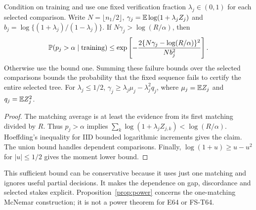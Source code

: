 \begin{proposition}\label{prop:selected-power}
Condition on training and use one fixed verification fraction $\lambda_j\in(0,1)$ for each selected comparison. Write $N=\lfloor n_1/2\rfloor$, $\gamma_j=\mathbb E\log(1+\lambda_j Z_j)$ and $b_j=\log\{(1+\lambda_j)/(1-\lambda_j)\}$. If $N\gamma_j>\log(R/\alpha)$, then
\[
 \mathbb P(p_j>\alpha\mid\text{training})\le
 \exp\left[-\frac{2\{N\gamma_j-\log(R/\alpha)\}^{2}}{N b_j^{2}}\right].
\]
Otherwise use the bound one. Summing these failure bounds over the selected comparisons bounds the probability that the fixed sequence fails to certify the entire selected tree. For $\lambda_j\le1/2$, $\gamma_j\ge\lambda_j\mu_j-\lambda_j^2q_j$, where $\mu_j=\mathbb E Z_j$ and $q_j=\mathbb E Z_j^2$.
\end{proposition}
\begin{proof}
The matching average is at least the evidence from its first matching divided by $R$. Thus $p_j>\alpha$ implies $\sum_k\log(1+\lambda_j Z_{j,k})<\log(R/\alpha)$. Hoeffding's inequality for IID bounded logarithmic increments gives the claim. The union bound handles dependent comparisons. Finally, $\log(1+u)\ge u-u^2$ for $|u|\le1/2$ gives the moment lower bound.
\end{proof}
This sufficient bound can be conservative because it uses just one matching and ignores useful partial decisions. It makes the dependence on gap, discordance and selected stakes explicit. Proposition~\ref{prop:power} concerns the one-matching McNemar construction; it is not a power theorem for E64 or FS-T64.
